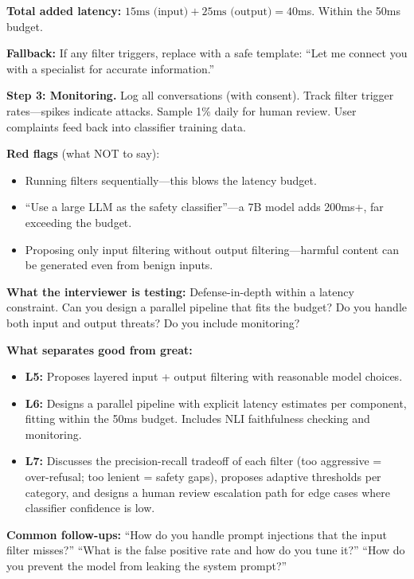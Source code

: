 \begin{interviewq}
\textbf{Total added latency:} $15\text{ms (input)} + 25\text{ms (output)} = 40$ms. Within the 50ms budget.

\textbf{Fallback:} If any filter triggers, replace with a safe template: ``Let me connect you with a specialist for accurate information.''

\textbf{Step 3: Monitoring.} Log all conversations (with consent). Track filter trigger rates---spikes indicate attacks. Sample 1\% daily for human review. User complaints feed back into classifier training data.

\textbf{Red flags} (what NOT to say):
\begin{itemize}
    \item Running filters sequentially---this blows the latency budget.
    \item ``Use a large LLM as the safety classifier''---a 7B model adds 200ms+, far exceeding the budget.
    \item Proposing only input filtering without output filtering---harmful content can be generated even from benign inputs.
\end{itemize}

\textbf{What the interviewer is testing:} Defense-in-depth within a latency constraint. Can you design a parallel pipeline that fits the budget? Do you handle both input and output threats? Do you include monitoring?

\textbf{What separates good from great:}
\begin{itemize}
    \item \textbf{L5:} Proposes layered input + output filtering with reasonable model choices.
    \item \textbf{L6:} Designs a parallel pipeline with explicit latency estimates per component, fitting within the 50ms budget. Includes NLI faithfulness checking and monitoring.
    \item \textbf{L7:} Discusses the precision-recall tradeoff of each filter (too aggressive = over-refusal; too lenient = safety gaps), proposes adaptive thresholds per category, and designs a human review escalation path for edge cases where classifier confidence is low.
\end{itemize}

\textbf{Common follow-ups:} ``How do you handle prompt injections that the input filter misses?'' ``What is the false positive rate and how do you tune it?'' ``How do you prevent the model from leaking the system prompt?''
\end{interviewq}

